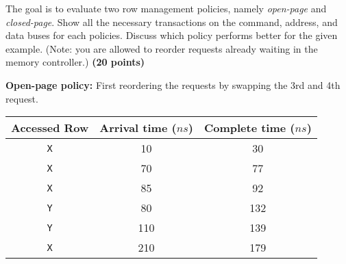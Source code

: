 \documentclass[a4paper, 11pt]{exam}
\begin{document}
\begin{enumerate}
The goal is to evaluate two row management policies, namely \textit{open-page} and \textit{closed-page}.
Show all the necessary transactions on the command, address, and data buses for each policies.
Discuss which policy performs better for the given example.
(Note: you are allowed to reorder requests already waiting in the memory controller.)
\textbf{(20 points)}

\textbf{Open-page policy:} First reordering the requests by swapping the 3rd and 4th request.

\begin{center}
	\begin{tabular}{|c|c|c|}
		\hline
		\textbf{Accessed Row} & \textbf{Arrival time ($ns$)} & \textbf{Complete time ($ns$)} \\
		\hline
		\texttt{X}  & 10 & 30\\
		\hline
		\texttt{X}  & 70 & 77\\
		\hline
		\texttt{X}  & 85 & 92\\
		\hline
		\texttt{Y}  & 80 & 132\\
		\hline
		\texttt{Y}  & 110 & 139\\
		\hline
		\texttt{X} & 210 & 179\\
		\hline
	\end{tabular}
\end{center}


\end{enumerate}
\end{document}
